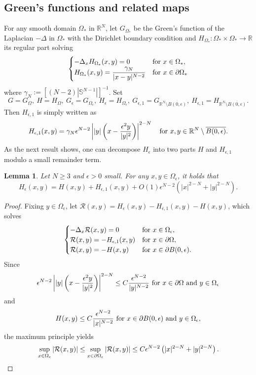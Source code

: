 \documentclass[reqno]{amsart}
\newtheorem{lemma}[theorem]{Lemma}
\theoremstyle{remark}
\newcommand{\pa}{\partial}
\newcommand{\ep}{\epsilon}
\newcommand{\ga}{\gamma}
\newcommand{\R}{\mathbb{R}}
\newcommand{\mcr}{\mathcal{R}}
\newcommand{\oms}{\Omega_*}
\renewcommand{\(}{\left(}
\renewcommand{\)}{\right)}
\numberwithin{equation}{section}
\begin{document}
\subsection{Green's functions and related maps}
For any smooth domain $\oms$ in $\R^N$, let $G_{\oms}$ be the Green's function of the Laplacian $-\Delta$ in $\oms$ with the Dirichlet boundary condition
and $H_{\oms}:\oms \times \oms \to \R$ its regular part solving
$$
\begin{cases}
-\Delta_x H_{\oms}(x,y)=0 &\textup{for } x \in \oms,\\
H_{\oms}(x,y)=\dfrac{\ga_N}{|x-y|^{N-2}} &\textup{for } x \in \pa \oms
\end{cases}
$$
where $\ga_N := [(N-2)|\mathbb{S}^{N-1}|]^{-1}$. Set
\[G = G_\Omega,\ H = H_\Omega,\ G_\ep = G_{\Omega_\ep},\ H_\ep = H_{\Omega_\ep},\ G_{\ep,1} = G_{\R^N \setminus \overline{B(0,\ep)}},\ H_{\ep,1} = H_{\R^N\setminus \overline{B(0,\ep)}}.\]
Then $H_{\ep,1}$ is simply written as
\begin{equation}\label{H ep1}
H_{\ep,1}(x,y)= \ga_N\ep^{N-2}\left||y|\(x-\frac{\ep^2y}{|y|^2}\)\right|^{2-N} \quad \textup{for } x, y \in \R^N\setminus \overline{B(0,\ep)}.
\end{equation}
As the next result shows, one can decompose $H_\ep$ into two parts $H$ and $H_{\ep,1}$ modulo a small remainder term.
\begin{lemma}\label{reg est for puntured}
Let $N \ge 3$ and $\ep > 0$ small. For any $x,y \in \Omega_\ep$, it holds that
$$
H_\ep(x,y)=H(x,y) + H_{\ep,1}(x,y) + O(1)\ep^{N-2}\(|x|^{2-N}+|y|^{2-N}\).
$$
\end{lemma}
\begin{proof}
Fixing $y \in \Omega_\ep$, let $\mcr(x,y)=H_\ep(x,y)-H_{\ep,1}(x,y)-H(x,y)$, which solves
$$
\begin{cases}
-\Delta_x \mcr(x,y)=0 &\textup{for } x \in \Omega_\ep,\\
\mcr(x,y)= -H_{\ep,1}(x,y) &\textup{for } x \in \pa \Omega,\\
\mcr(x,y)= -H(x,y) &\textup{for } x \in \pa B(0,\ep).
\end{cases}
$$
Since
$$
\ep^{N-2}\left||y|\(x-\frac{\ep^2y}{|y|^2}\)\right|^{2-N} \le C \frac{\ep^{N-2}}{|y|^{N-2}} \textup{ for } x \in \pa \Omega \textup{ and } y \in \Omega_\ep
$$
and
$$
H(x,y)\le C\frac{\ep^{N-2}}{|x|^{N-2}} \textup{ for } x \in \pa B(0,\ep) \textup{ and } y \in \Omega_\ep,
$$
the maximum principle yields
\[\sup_{x \in \Omega_\ep}|\mcr(x,y)| \le \sup_{x \in \pa \Omega_\ep}|\mcr(x,y)|\le C\ep^{N-2}\(|x|^{2-N}+|y|^{2-N}\). \qedhere\]
\end{proof}
\end{document}
